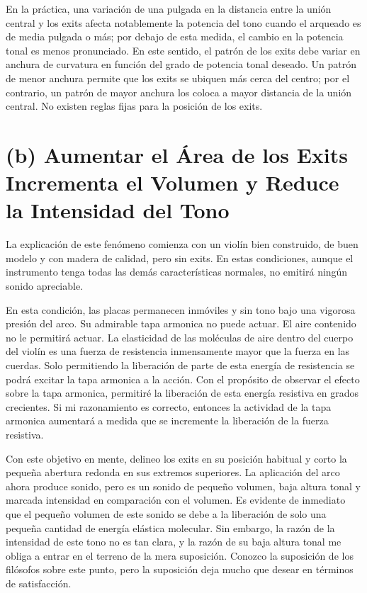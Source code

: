 \documentclass[12pt]{book}
\begin{document}
En la práctica, una variación de una pulgada en la distancia entre la unión central y los exits afecta notablemente la potencia del tono cuando el arqueado es de media pulgada o más; por debajo de esta medida, el cambio en la potencia tonal es menos pronunciado. En este sentido, el patrón de los exits debe variar en anchura de curvatura en función del grado de potencia tonal deseado. Un patrón de menor anchura permite que los exits se ubiquen más cerca del centro; por el contrario, un patrón de mayor anchura los coloca a mayor distancia de la unión central. No existen reglas fijas para la posición de los exits.

\section*{(b) Aumentar el Área de los Exits Incrementa el Volumen y Reduce la Intensidad del Tono}

La explicación de este fenómeno comienza con un violín bien construido, de buen modelo y con madera de calidad, pero sin exits. En estas condiciones, aunque el instrumento tenga todas las demás características normales, no emitirá ningún sonido apreciable. 

En esta condición, las placas permanecen inmóviles y sin tono bajo una vigorosa presión del arco. Su admirable tapa armonica no puede actuar. El aire contenido no le permitirá actuar. La elasticidad de las moléculas de aire dentro del cuerpo del violín es una fuerza de resistencia inmensamente mayor que la fuerza en las cuerdas. Solo permitiendo la liberación de parte de esta energía de resistencia se podrá excitar la tapa armonica a la acción. Con el propósito de observar el efecto sobre la tapa armonica, permitiré la liberación de esta energía resistiva en grados crecientes. Si mi razonamiento es correcto, entonces la actividad de la tapa armonica aumentará a medida que se incremente la liberación de la fuerza resistiva.

Con este objetivo en mente, delineo los exits en su posición habitual y corto la pequeña abertura redonda en sus extremos superiores. La aplicación del arco ahora produce sonido, pero es un sonido de pequeño volumen, baja altura tonal y marcada intensidad en comparación con el volumen. Es evidente de inmediato que el pequeño volumen de este sonido se debe a la liberación de solo una pequeña cantidad de energía elástica molecular. Sin embargo, la razón de la intensidad de este tono no es tan clara, y la razón de su baja altura tonal me obliga a entrar en el terreno de la mera suposición. Conozco la suposición de los filósofos sobre este punto, pero la suposición deja mucho que desear en términos de satisfacción.
\end{document}
